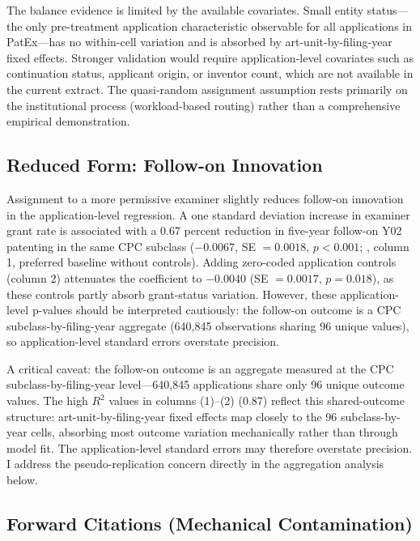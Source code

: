 \documentclass[12pt]{article}
\begin{document}
The balance evidence is limited by the available covariates. Small entity status---the only pre-treatment application characteristic observable for all applications in PatEx---has no within-cell variation and is absorbed by art-unit-by-filing-year fixed effects. Stronger validation would require application-level covariates such as continuation status, applicant origin, or inventor count, which are not available in the current extract. The quasi-random assignment assumption rests primarily on the institutional process (workload-based routing) rather than a comprehensive empirical demonstration.

\subsection{Reduced Form: Follow-on Innovation}



Assignment to a more permissive examiner slightly reduces follow-on innovation in the application-level regression. A one standard deviation increase in examiner grant rate is associated with a 0.67 percent reduction in five-year follow-on Y02 patenting in the same CPC subclass ($-0.0067$, SE $= 0.0018$, $p < 0.001$; , column 1, preferred baseline without controls). Adding zero-coded application controls (column 2) attenuates the coefficient to $-0.0040$ (SE $= 0.0017$, $p = 0.018$), as these controls partly absorb grant-status variation. However, these application-level p-values should be interpreted cautiously: the follow-on outcome is a CPC subclass-by-filing-year aggregate (640,845 observations sharing 96 unique values), so application-level standard errors overstate precision.

A critical caveat: the follow-on outcome is an aggregate measured at the CPC subclass-by-filing-year level---640,845 applications share only 96 unique outcome values. The high $R^2$ values in columns (1)--(2) (0.87) reflect this shared-outcome structure: art-unit-by-filing-year fixed effects map closely to the 96 subclass-by-year cells, absorbing most outcome variation mechanically rather than through model fit. The application-level standard errors may therefore overstate precision. I address the pseudo-replication concern directly in the aggregation analysis below.

\subsection{Forward Citations (Mechanical Contamination)}
\end{document}
